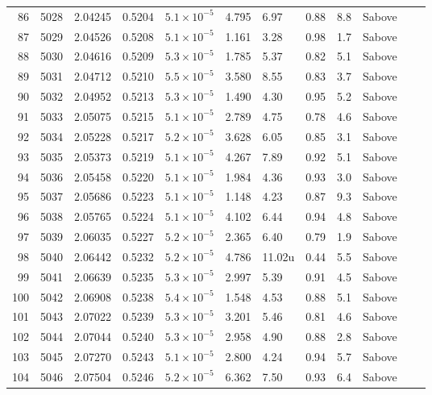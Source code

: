 \begin{longtable}{@{}rrllllllllll@{}}
 86 & 5028 & 2.04245 & 0.5204 & $5.1\times10^{-5}$ & 4.795 & 6.97 & 0.88 & 8.8 & Sabove &  &  \\
 87 & 5029 & 2.04526 & 0.5208 & $5.1\times10^{-5}$ & 1.161 & 3.28 & 0.98 & 1.7 & Sabove &  &  \\
 88 & 5030 & 2.04616 & 0.5209 & $5.3\times10^{-5}$ & 1.785 & 5.37 & 0.82 & 5.1 & Sabove &  &  \\
 89 & 5031 & 2.04712 & 0.5210 & $5.5\times10^{-5}$ & 3.580 & 8.55 & 0.83 & 3.7 & Sabove &  &  \\
 90 & 5032 & 2.04952 & 0.5213 & $5.3\times10^{-5}$ & 1.490 & 4.30 & 0.95 & 5.2 & Sabove &  &  \\
 91 & 5033 & 2.05075 & 0.5215 & $5.1\times10^{-5}$ & 2.789 & 4.75 & 0.78 & 4.6 & Sabove &  &  \\
 92 & 5034 & 2.05228 & 0.5217 & $5.2\times10^{-5}$ & 3.628 & 6.05 & 0.85 & 3.1 & Sabove &  &  \\
 93 & 5035 & 2.05373 & 0.5219 & $5.1\times10^{-5}$ & 4.267 & 7.89 & 0.92 & 5.1 & Sabove &  &  \\
 94 & 5036 & 2.05458 & 0.5220 & $5.1\times10^{-5}$ & 1.984 & 4.36 & 0.93 & 3.0 & Sabove &  &  \\
 95 & 5037 & 2.05686 & 0.5223 & $5.1\times10^{-5}$ & 1.148 & 4.23 & 0.87 & 9.3 & Sabove &  &  \\
 96 & 5038 & 2.05765 & 0.5224 & $5.1\times10^{-5}$ & 4.102 & 6.44 & 0.94 & 4.8 & Sabove &  &  \\
 97 & 5039 & 2.06035 & 0.5227 & $5.2\times10^{-5}$ & 2.365 & 6.40 & 0.79 & 1.9 & Sabove &  &  \\
 98 & 5040 & 2.06442 & 0.5232 & $5.2\times10^{-5}$ & 4.786 & 11.02u & 0.44 & 5.5 & Sabove &  &  \\
 99 & 5041 & 2.06639 & 0.5235 & $5.3\times10^{-5}$ & 2.997 & 5.39 & 0.91 & 4.5 & Sabove &  &  \\
 100 & 5042 & 2.06908 & 0.5238 & $5.4\times10^{-5}$ & 1.548 & 4.53 & 0.88 & 5.1 & Sabove &  &  \\
 101 & 5043 & 2.07022 & 0.5239 & $5.3\times10^{-5}$ & 3.201 & 5.46 & 0.81 & 4.6 & Sabove &  &  \\
 102 & 5044 & 2.07044 & 0.5240 & $5.3\times10^{-5}$ & 2.958 & 4.90 & 0.88 & 2.8 & Sabove &  &  \\
 103 & 5045 & 2.07270 & 0.5243 & $5.1\times10^{-5}$ & 2.800 & 4.24 & 0.94 & 5.7 & Sabove &  &  \\
 104 & 5046 & 2.07504 & 0.5246 & $5.2\times10^{-5}$ & 6.362 & 7.50 & 0.93 & 6.4 & Sabove &  &  \\

\end{longtable}
